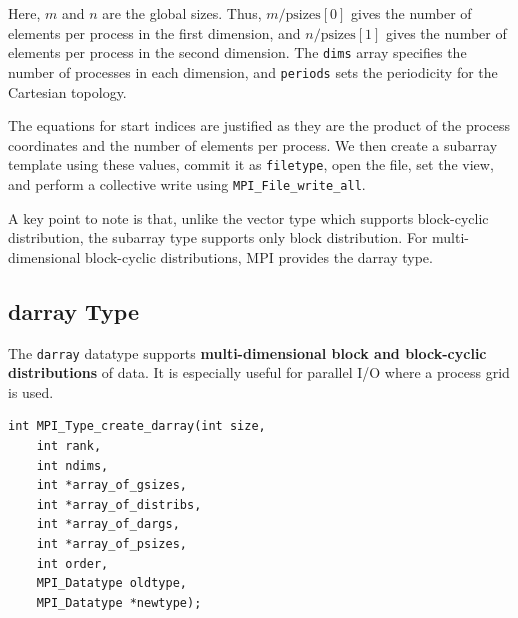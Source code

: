 \documentclass[12pt]{book}
\begin{document}
Here, $m$ and $n$ are the global sizes. Thus, $m / \text{psizes}[0]$ gives the number of elements per process in the first dimension, and $n / \text{psizes}[1]$ gives the number of elements per process in the second dimension. The \texttt{dims} array specifies the number of processes in each dimension, and \texttt{periods} sets the periodicity for the Cartesian topology.

The equations for start indices are justified as they are the product of the process coordinates and the number of elements per process. We then create a subarray template using these values, commit it as \texttt{filetype}, open the file, set the view, and perform a collective write using \texttt{MPI\_File\_write\_all}.

A key point to note is that, unlike the vector type which supports block-cyclic distribution, the subarray type supports only block distribution. For multi-dimensional block-cyclic distributions, MPI provides the darray type.


\subsection{darray Type}
\label{subsec:darray_type}

The \texttt{darray} datatype supports \textbf{multi-dimensional block and block-cyclic distributions} of data. It is especially useful for parallel I/O where a process grid is used.

\begin{lstlisting}[style=cppstyle]
int MPI_Type_create_darray(int size,
    int rank,
    int ndims,
    int *array_of_gsizes,
    int *array_of_distribs,
    int *array_of_dargs,
    int *array_of_psizes,
    int order,
    MPI_Datatype oldtype,
    MPI_Datatype *newtype);
\end{lstlisting}
\end{document}
